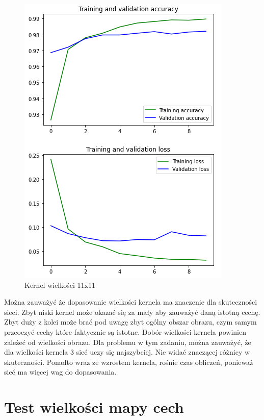 \documentclass{article}
\begin{document}
\begin{figure}[h]
  \centering
  \includegraphics[width=\linewidth]{kernel_11_11.png}
  \caption{Kernel wielkości 11x11}
\end{figure}

Można zauważyć że dopasowanie wielkości kernela ma znaczenie dla skuteczności sieci. Zbyt niski kernel może okazać się za mały aby zauważyć daną istotną cechę.
Zbyt duży z kolei może brać pod uwagę zbyt ogólny obszar obrazu, czym samym przeoczyć cechy które faktycznie są istotne.
Dobór wielkości kernela powinien zależeć od wielkości obrazu. Dla problemu w tym zadaniu, można zauważyć, że dla wielkości kernela 3 sieć uczy się najszybciej.
Nie widać znaczącej różnicy w skuteczności. Ponadto wraz ze wzrostem kernela, rośnie czas obliczeń, ponieważ sieć ma więcej wag do dopasowania.

\newpage
\section{Test wielkości mapy cech}
\end{document}
